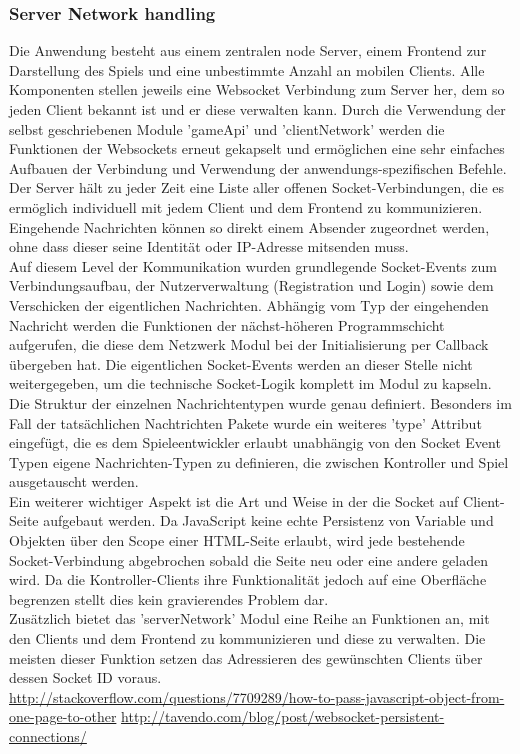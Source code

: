 \documentclass[a4paper]{spie}  %
\begin{document}
\subsubsection{Server Network handling}
Die Anwendung besteht aus einem zentralen node Server, einem Frontend zur Darstellung des Spiels und eine unbestimmte Anzahl an mobilen Clients. Alle Komponenten stellen jeweils eine Websocket Verbindung zum Server her, dem so jeden Client bekannt ist und er diese verwalten kann. Durch die Verwendung der selbst geschriebenen Module 'gameApi' und 'clientNetwork' werden die Funktionen der Websockets erneut gekapselt und ermöglichen eine sehr einfaches Aufbauen der Verbindung und Verwendung der anwendungs-spezifischen Befehle.\\
Der Server hält zu jeder Zeit eine Liste aller offenen Socket-Verbindungen, die es ermöglich individuell mit jedem Client und dem Frontend zu kommunizieren. Eingehende Nachrichten können so direkt einem Absender zugeordnet werden, ohne dass dieser seine Identität oder IP-Adresse mitsenden muss.\\
Auf diesem Level der Kommunikation wurden grundlegende Socket-Events zum Verbindungsaufbau, der Nutzerverwaltung (Registration und Login) sowie dem Verschicken der eigentlichen Nachrichten. Abhängig vom Typ der eingehenden Nachricht werden die Funktionen der nächst-höheren Programmschicht aufgerufen, die diese dem Netzwerk Modul bei der Initialisierung per Callback übergeben hat. Die eigentlichen Socket-Events werden an dieser Stelle nicht weitergegeben, um die technische Socket-Logik komplett im Modul zu kapseln. Die Struktur der einzelnen Nachrichtentypen wurde genau definiert. Besonders im Fall der tatsächlichen Nachtrichten Pakete wurde ein weiteres 'type' Attribut eingefügt, die es dem Spieleentwickler erlaubt unabhängig von den Socket Event Typen eigene Nachrichten-Typen zu definieren, die zwischen Kontroller und Spiel ausgetauscht werden.\\
Ein weiterer wichtiger Aspekt ist die Art und Weise in der die Socket auf Client-Seite aufgebaut werden. Da JavaScript keine echte Persistenz von Variable und Objekten über den Scope einer HTML-Seite erlaubt, wird jede bestehende Socket-Verbindung abgebrochen sobald die Seite neu oder eine andere geladen wird. Da die Kontroller-Clients ihre Funktionalität jedoch auf eine Oberfläche begrenzen stellt dies kein gravierendes Problem dar.\\
Zusätzlich bietet das 'serverNetwork' Modul eine Reihe an Funktionen an, mit den Clients und dem Frontend zu kommunizieren und diese zu verwalten. Die meisten dieser Funktion setzen das Adressieren des gewünschten Clients über dessen Socket ID voraus.\\
\url{http://stackoverflow.com/questions/7709289/how-to-pass-javascript-object-from-one-page-to-other}
\url{http://tavendo.com/blog/post/websocket-persistent-connections/}
\end{document}
